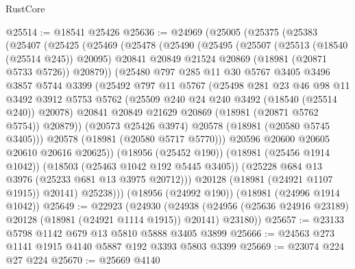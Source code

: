 \begin{lexlean}{RustCore}
\begin{coremodule}
@25514 := @18541 @25426
@25636 := @24969
    (@25005
      (@25375
        (@25383
          (@25407
            (@25425
              (@25469
                (@25478
                  (@25490
                    (@25495
                      (@25507
                        (@25513 (@18540 (@25514 @245)) @20095)
                        @20841
                        @20849
                        @21524
                        @20869
                        (@18981 (@20871 @5733 @5726))
                        @20879))
                    (@25480
                      @797
                      @285
                      @11
                      @30
                      @5767
                      @3405
                      @3496
                      @3857
                      @5744
                      @3399
                      (@25492
                        @797
                        @11
                        @5767
                        (@25498
                          @281
                          @23
                          @46
                          @98
                          @11
                          @3492
                          @3912
                          @5753
                          @5762
                          (@25509 @240 @24 @240 @3492 (@18540 (@25514 @240)) @20078)
                          @20841
                          @20849
                          @21629
                          @20869
                          (@18981 (@20871 @5762 @5754))
                          @20879))
                      (@20573 @25426 @3974)
                      @20578
                      (@18981 (@20580 @5745 @3405)))
                    @20578
                    (@18981 (@20580 @5717 @5770)))
                  @20596
                  @20600
                  @20605
                  @20610
                  @20616
                  @20625))
              (@18956 (@25452 @190))
              (@18981 (@25456 @1914 @1042))
              (@18503 (@25463 @1042 @192 @5445 @3405))
              (@25228 @684 @13 @3976 (@25233 @681 @13 @3975 @20712)))
            @20128
            (@18981 (@24921 @1107 @1915))
            @20141)
          @25238)))
    (@18956 (@24992 @190))
    (@18981 (@24996 @1914 @1042))
@25649 := @22923
    (@24930
      (@24938 (@24956 (@25636 @24916 @23189) @20128 (@18981 (@24921 @1114 @1915)) @20141) @23180))
@25657 := @23133 @5798 @1142 @679 @13 @5810 @5888 @3405 @3899
@25666 := @24563 @273 @1141 @1915 @4140 @5887 @192 @3393 @5803 @3399
@25669 := @23074 @224 @27 @224
@25670 := @25669 @4140

\end{coremodule}
\end{lexlean}
